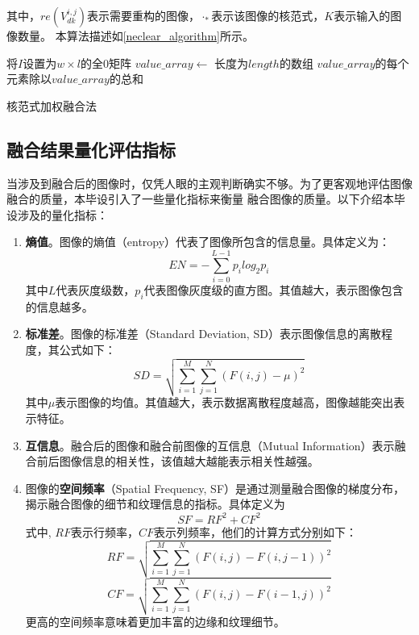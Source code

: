 \documentclass{xduugthesis}
\begin{document}
其中，$re\left(V_{dk}^{i,j}\right)$表示需要重构的图像，$\cdot_*$表示该图像的核范式，$K$表示输入的图像数量。
本算法描述如\ref{neclear_algorithm}所示。\par
\IncMargin{2em}
\begin{algorithm}[H]
	将$I$设置为$w\times l$的全0矩阵\;
	$value\_array\leftarrow$ 长度为$length$的数组\;
	$value\_array$的每个元素除以$value\_array$的总和\;
	\caption{核范式加权融合法}\label{neclear_algorithm}
\end{algorithm}
\DecMargin{2em}
\subsection{融合结果量化评估指标}\label{evaluation_subsection}
当涉及到融合后的图像时，仅凭人眼的主观判断确实不够。为了更客观地评估图像融合的质量，本毕设引入了一些量化指标来衡量
融合图像的质量。以下介绍本毕设涉及的量化指标\cite{Eval}：\par
\begin{enumerate}
\item \textbf{熵值}。图像的熵值（entropy）代表了图像所包含的信息量。具体定义为：
\begin{equation}EN=-\sum_{i=0}^{L-1}p_ilog_2p_i\end{equation}
其中$L$代表灰度级数，$p_i$代表图像灰度级的直方图。其值越大，表示图像包含的信息越多。\par
\item \textbf{标准差}。图像的标准差（Standard Deviation, SD）表示图像信息的离散程度，其公式如下：
\begin{equation}SD=\sqrt{\sum_{i=1}^{M}\sum_{j=1}^{N}(F(i,j)-\mu)^2}\end{equation}
其中$\mu$表示图像的均值。其值越大，表示数据离散程度越高，图像越能突出表示特征。
\item \textbf{互信息}。融合后的图像和融合前图像的互信息（Mutual Information）表示融合前后图像信息的相关性，该值越大越能表示相关性越强。
\item 图像的\textbf{空间频率}（Spatial Frequency, SF）是通过测量融合图像的梯度分布，揭示融合图像的细节和纹理信息的指标。具体定义为
\begin{equation}SF = RF^2 + CF^2\end{equation}
式中, $RF$表示行频率，$CF$表示列频率，他们的计算方式分别如下：
\begin{equation}RF = \sqrt{\sum_{i=1}^{M}\sum_{j=1}^{N}(F(i,j)-F(i,j-1))^2}\end{equation}
\begin{equation}CF = \sqrt{\sum_{i=1}^{M}\sum_{j=1}^{N}(F(i,j)-F(i-1,j))^2}\end{equation}
更高的空间频率意味着更加丰富的边缘和纹理细节。
\end{enumerate}
\end{document}
